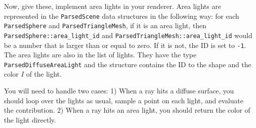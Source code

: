 Now, give these, implement area lights in your renderer. Area lights are represented in the \lstinline{ParsedScene} data structures in the following way: for each \lstinline{ParsedSphere} and \lstinline{ParsedTriangleMesh}, if it is an area light, then \lstinline{ParsedSphere::area_light_id} and \lstinline{ParsedTriangleMesh::area_light_id} would be a number that is larger than or equal to zero. If it is not, the ID is set to \lstinline{-1}. The area lights are also in the list of lights. They have the type \lstinline{ParsedDiffuseAreaLight} and the structure contains the ID to the shape and the color $I$ of the light.

You will need to handle two cases: 1) When a ray hits a diffuse surface, you should loop over the lights as usual, sample a point on each light, and evaluate the contribution. 2) When a ray hits an area light, you should return the color of the light directly.

%
%


